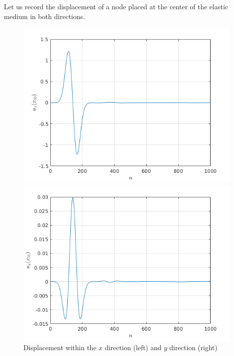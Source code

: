 Let us record the displacement of a node placed at the center of the elastic medium in both directions. 
\begin{figure}[H]
\centering
\begin{minipage}{.5\textwidth}
  \centering
  \includegraphics[width=1.\linewidth]{images/disp_imp_x.png}
\end{minipage}%
\begin{minipage}{.5\textwidth}
  \centering
  \includegraphics[width=1.\linewidth]{images/disp_imp_y.png}
\end{minipage}
\caption{Displacement within the $x$ direction (left) and $y$ direction (right)}
\label{fig:disp_imp_pml}
\end{figure} 
